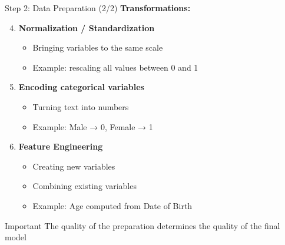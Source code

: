 \documentclass[12pt,aspectratio=169]{beamer}
\begin{document}
\begin{frame}{Step 2: Data Preparation (2/2)}
\textbf{Transformations:}

\begin{enumerate}
\setcounter{enumi}{3}
\item \textbf{Normalization / Standardization}
\begin{itemize}
\item Bringing variables to the same scale
\item Example: rescaling all values between 0 and 1
\end{itemize}

\item \textbf{Encoding categorical variables}
\begin{itemize}
\item Turning text into numbers
\item Example: Male → 0, Female → 1
\end{itemize}

\item \textbf{Feature Engineering}
\begin{itemize}
\item Creating new variables
\item Combining existing variables
\item Example: Age computed from Date of Birth
\end{itemize}
\end{enumerate}

\begin{alertblock}{Important}
The quality of the preparation determines the quality of the final model
\end{alertblock}
\end{frame}
\end{document}
